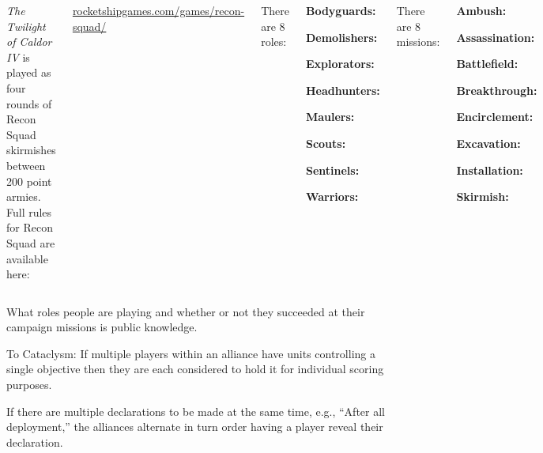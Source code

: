 \clearpage
{}

\begin{columns}

  \emph{The Twilight of Caldor IV} is played as four rounds of Recon
  Squad skirmishes between 200 point armies.  Full rules for Recon
  Squad are available here:

\centerline{\url{rocketshipgames.com/games/recon-squad/}}


There are 8 roles:
\begin{squishitemize}
  \item \textbf{Bodyguards:}
  \item \textbf{Demolishers:}
  \item \textbf{Explorators:}
  \item \textbf{Headhunters:}
  \item \textbf{Maulers:}
  \item \textbf{Scouts:}
  \item \textbf{Sentinels:}
  \item \textbf{Warriors:}
\end{squishitemize}

There are 8 missions:
\begin{squishitemize}
\item \textbf{Ambush:}
\item \textbf{Assassination:}
\item \textbf{Battlefield:}
\item \textbf{Breakthrough:}
\item \textbf{Encirclement:}
\item \textbf{Excavation:}
\item \textbf{Installation:}
\item \textbf{Skirmish:}
\end{squishitemize}

\end{columns}

What roles people are playing and whether or not they succeeded at
their campaign missions is public knowledge.

To Cataclysm: If multiple players within an alliance have units
controlling a single objective then they are each considered to hold
it for individual scoring purposes.


If there are multiple declarations to be made at the same time, e.g.,
``After all deployment,'' the alliances alternate in turn order having
a player reveal their declaration.

